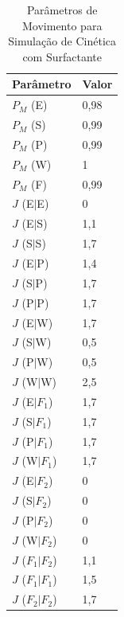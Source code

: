 \documentclass[12pt,oneside]{report}
\begin{document}
\begin{table}[H]
    \centering
    \caption{Parâmetros de Movimento para Simulação de Cinética com Surfactante}
    \vspace{0.2cm}
    \begin{tabularx}{\textwidth}{X m{5cm}}
        \hline
        \textbf{Parâmetro} & \textbf{Valor} \\
        \hline
        $P_M$ (E)          & 0{,}98         \\
        $P_M$ (S)          & 0{,}99         \\
        $P_M$ (P)          & 0{,}99         \\
        $P_M$ (W)          & 1              \\
        $P_M$ (F)          & 0{,}99         \\
        $J$ (E$|$E)        & 0              \\
        $J$ (E$|$S)        & 1{,}1          \\
        $J$ (S$|$S)        & 1{,}7          \\
        $J$ (E$|$P)        & 1{,}4          \\
        $J$ (S$|$P)        & 1{,}7          \\
        $J$ (P$|$P)        & 1{,}7          \\
        $J$ (E$|$W)        & 1{,}7          \\
        $J$ (S$|$W)        & 0{,}5          \\
        $J$ (P$|$W)        & 0{,}5          \\
        $J$ (W$|$W)        & 2{,}5          \\
        $J$ (E$|F_1$)      & 1{,}7          \\
        $J$ (S$|F_1$)      & 1{,}7          \\
        $J$ (P$|F_1$)      & 1{,}7          \\
        $J$ (W$|F_1$)      & 1{,}7          \\
        $J$ (E$|F_2$)      & 0              \\
        $J$ (S$|F_2$)      & 0              \\
        $J$ (P$|F_2$)      & 0              \\
        $J$ (W$|F_2$)      & 0              \\
        $J$ ($F_1|F_2$)    & 1{,}1          \\
        $J$ ($F_1|F_1$)    & 1{,}5          \\
        $J$ ($F_2|F_2$)    & 1{,}7          \\
        \hline
    \end{tabularx}
    \vspace{0.2cm}
    \label{tab:params_movimento_surfactante_high}
\end{table}
\end{document}
